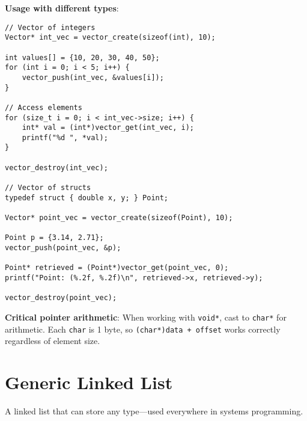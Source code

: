 \textbf{Usage with different types}:

\begin{lstlisting}
// Vector of integers
Vector* int_vec = vector_create(sizeof(int), 10);

int values[] = {10, 20, 30, 40, 50};
for (int i = 0; i < 5; i++) {
    vector_push(int_vec, &values[i]);
}

// Access elements
for (size_t i = 0; i < int_vec->size; i++) {
    int* val = (int*)vector_get(int_vec, i);
    printf("%d ", *val);
}

vector_destroy(int_vec);

// Vector of structs
typedef struct { double x, y; } Point;

Vector* point_vec = vector_create(sizeof(Point), 10);

Point p = {3.14, 2.71};
vector_push(point_vec, &p);

Point* retrieved = (Point*)vector_get(point_vec, 0);
printf("Point: (%.2f, %.2f)\n", retrieved->x, retrieved->y);

vector_destroy(point_vec);
\end{lstlisting}

\textbf{Critical pointer arithmetic}: When working with \texttt{void*}, cast to \texttt{char*} for arithmetic. Each \texttt{char} is 1 byte, so \texttt{(char*)data + offset} works correctly regardless of element size.

\section{Generic Linked List}

A linked list that can store any type---used everywhere in systems programming.

